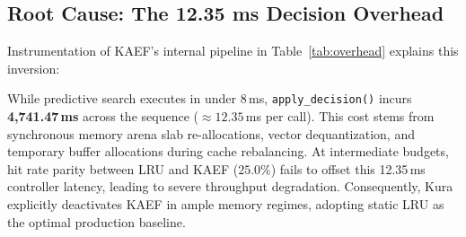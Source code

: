 \subsection{Root Cause: The 12.35 ms Decision Overhead}
Instrumentation of KAEF's internal pipeline in Table~\ref{tab:overhead} explains this inversion:

\begin{table}[h]
\caption{Cumulative timing breakdown of KAEF planning pipeline across 24 tokens (384 decisions) under a 24\,MB RAM budget.}
\label{tab:overhead}
\centering
{}
\end{table}

While predictive search executes in under 8\,ms, \texttt{apply\_decision()} incurs \textbf{4,741.47\,ms} across the sequence ($\approx 12.35$\,ms per call). This cost stems from synchronous memory arena slab re-allocations, vector dequantization, and temporary buffer allocations during cache rebalancing. At intermediate budgets, hit rate parity between LRU and KAEF ($25.0\%$) fails to offset this 12.35\,ms controller latency, leading to severe throughput degradation. Consequently, Kura explicitly deactivates KAEF in ample memory regimes, adopting static LRU as the optimal production baseline.
